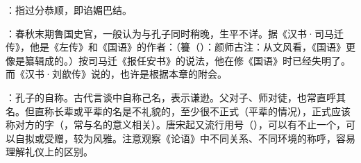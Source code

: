 {
\item {}：指过分恭顺，即谄媚巴结。
\item {}：春秋末期鲁国史官，一般认为与孔子同时稍晚，生平不详。据《汉书·司马迁传》，他是《左传》和《国语》的作者：（籑（）：颜师古注：从文风看，《国语》更像是纂辑成的。）按司马迁《报任安书》的说法，他在修《国语》时已经失明了。而《汉书·刘歆传》说的，也许是根据本章的附会。

\item {}：孔子的自称。古代言谈中自称己名，表示谦逊。父对子、师对徒，也常直呼其名。但直称长辈或平辈的名是不礼貌的，至少很不正式（平辈的情况），正式应该称对方的字（，常与名的意义相关）。唐宋起又流行用号（），可以有不止一个，可以自拟或受赠，较为风雅。注意观察《论语》中不同关系、不同环境的称呼，容易理解礼仪上的区别。
}
{}


